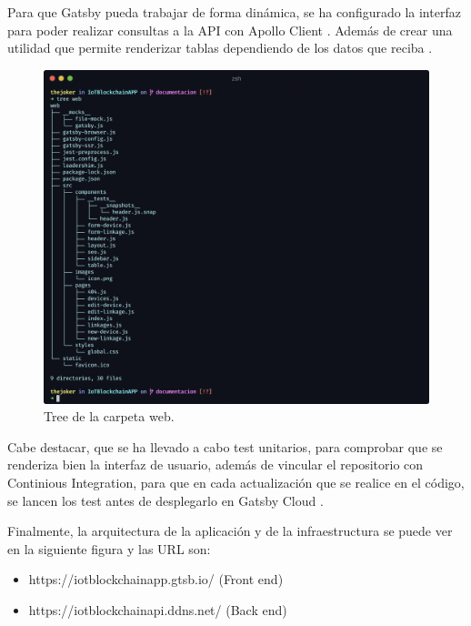 \noindent Para que Gatsby pueda trabajar de forma dinámica, se ha configurado la interfaz para poder realizar consultas
a la API con Apollo Client \cite{setup-apollo-gatsby}. Además de crear una utilidad que permite renderizar tablas 
dependiendo de los datos que reciba \cite{dynamic-table}.

\begin{figure}[ht!]
  \centering
  \includegraphics[width=\textwidth]{imagenes/desarrollo/tree_web}
  \caption{Tree de la carpeta web.}
  \label{fig:tree-web}
\end{figure}

\vspace{5mm}

\noindent Cabe destacar, que se ha llevado a cabo test unitarios, para comprobar que se renderiza bien la interfaz de 
usuario, además de vincular el repositorio con Continious Integration, para que en cada actualización que se realice 
en el código, se lancen los test antes de desplegarlo en Gatsby Cloud \cite{unit-test, travis-ci-nodejs}.

\vspace{5mm}

\noindent Finalmente, la arquitectura de la aplicación y de la infraestructura se puede ver en la siguiente figura
y las URL son: 

\begin{itemize}
  \item https://iotblockchainapp.gtsb.io/ (Front end)
  \item https://iotblockchainapi.ddns.net/ (Back end)
\end{itemize}

